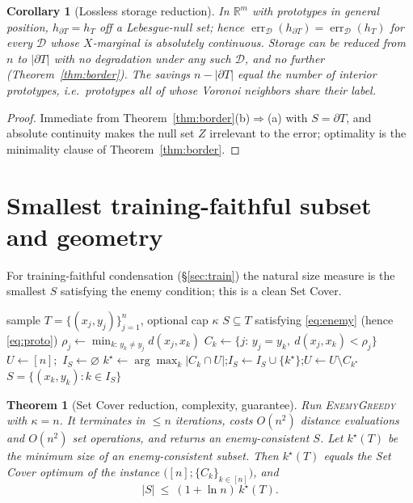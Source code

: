 \documentclass{amsart}
\newtheorem{theorem}{Theorem}
\newtheorem{corollary}{Corollary}
\theoremstyle{definition}
\DeclareMathOperator{\err}{err}
\begin{document}
\begin{corollary}[Lossless storage reduction]\label{cor:lossless}
In $\mathbb R^m$ with prototypes in general position, $h_{\partial T}=h_T$ off a
Lebesgue-null set; hence $\err_\mathcal D(h_{\partial T})=\err_\mathcal D(h_T)$
for every $\mathcal D$ whose $X$-marginal is absolutely continuous. Storage can
be reduced from $n$ to $|\partial T|$ \emph{with no degradation under any such
$\mathcal D$}, and no further (Theorem~\ref{thm:border}). The savings
$n-|\partial T|$ equal the number of interior prototypes, i.e.\ prototypes all
of whose Voronoi neighbors share their label.
\end{corollary}

\begin{proof}
Immediate from Theorem~\ref{thm:border}(b)$\Rightarrow$(a) with $S=\partial T$,
and absolute continuity makes the null set $Z$ irrelevant to the error;
optimality is the minimality clause of Theorem~\ref{thm:border}.
\end{proof}

\section{Smallest training-faithful subset and geometry}\label{sec:algo}

For training-faithful condensation (\S\ref{sec:train}) the natural size measure
is the smallest $S$ satisfying the enemy condition; this is a clean Set Cover.

\begin{algorithm}[H]
\caption{\textsc{EnemyGreedy}: small enemy-consistent subset}
\label{alg:greedy}
\begin{algorithmic}[1]
\Require sample $T=\{(x_j,y_j)\}_{j=1}^n$, optional cap $\kappa$
\Ensure $S\subseteq T$ satisfying \eqref{eq:enemy} (hence \eqref{eq:proto})
 \State $\rho_j\leftarrow\min_{k:\,y_k\ne y_j}d(x_j,x_k)$ \EndFor
{} \State $C_k\leftarrow\{j:\,y_j=y_k,\ d(x_j,x_k)<\rho_j\}$ \EndFor
\State $U\leftarrow[n]$;\ $I_S\leftarrow\varnothing$
   \State $k^\star\leftarrow\arg\max_k|C_k\cap U|$;\quad $I_S\leftarrow I_S\cup\{k^\star\}$;\quad $U\leftarrow U\setminus C_{k^\star}$
\EndWhile
\State \Return $S=\{(x_k,y_k):k\in I_S\}$
\end{algorithmic}
\end{algorithm}

\begin{theorem}[Set Cover reduction, complexity, guarantee]\label{thm:greedy}
Run \textsc{EnemyGreedy} with $\kappa=n$. It terminates in $\le n$ iterations,
costs $O(n^2)$ distance evaluations and $O(n^2)$ set operations, and returns an
enemy-consistent $S$. Let $k^\star(T)$ be the minimum size of an
enemy-consistent subset. Then $k^\star(T)$ equals the Set Cover optimum of the
instance $\big([n];\{C_k\}_{k\in[n]}\big)$, and
\[
|S|\ \le\ (1+\ln n)\,k^\star(T) .
\]
\end{theorem}
\end{document}
